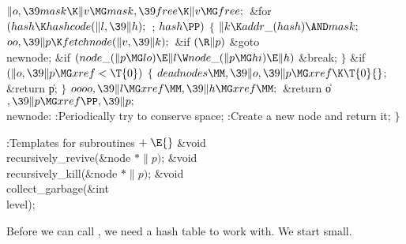 ${}\|o,\39\\{mask}\K\|v\MG\\{mask},\39\\{free}\K\|v\MG\\{free};{}$\6
\&{for} ${}(\\{hash}\K\\{hashcode}(\|l,\39\|h);{}$  ; ${}\\{hash}\PP){}$\5
${}\{{}$\1\6
${}\|k\K\\{addr\_}(\\{hash})\AND\\{mask};{}$\6
${}\\{oo},\39\|p\K\\{fetchnode}(\|v,\39\|k);{}$\6
\&{if} ${}(\R\|p){}$\1\5
\&{goto} \\{newnode};\2\6
\&{if} ${}(\\{node\_}(\|p\MG\\{lo})\E\|l\W\\{node\_}(\|p\MG\\{hi})\E\|h){}$\1\5
\&{break};\2\6
\4${}\}{}$\2\6
\&{if} ${}(\|o,\39\|p\MG\\{xref}<\T{0}){}$\5
${}\{{}$\1\6
${}\\{deadnodes}\MM,\39\|o,\39\|p\MG\\{xref}\K\T{0}{}$;\6
\&{return} \|p;\6
\4${}\}{}$\2\6
${}\\{oooo},\39\|l\MG\\{xref}\MM,\39\|h\MG\\{xref}\MM;{}$\6
\&{return} \|o${},\39\|p\MG\\{xref}\PP,\39\|p;{}$\6
\4\\{newnode}:\5
:Periodically try to conserve space\X;\6
:Create a new node and return it\X;\6
\4${}\}{}$\2\par
\fi

\B{}:Templates for subroutines\X${}\mathrel+\E{}$\6
\&{void} \\{recursively\_revive}(\&{node} ${}{*}\|p){}$;\6
\&{void} \\{recursively\_kill}(\&{node} ${}{*}\|p){}$;\6
\&{void} \\{collect\_garbage}(\&{int} \\{level});\par
\fi

Before we can call , we need a hash
table to work with.
We start small.

